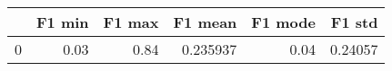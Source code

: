 \begin{tabular}{lrrrrr}
\toprule
{} &  F1 min &  F1 max &   F1 mean &  F1 mode &   F1 std \\
\midrule
0 &    0.03 &    0.84 &  0.235937 &     0.04 &  0.24057 \\
\bottomrule
\end{tabular}
